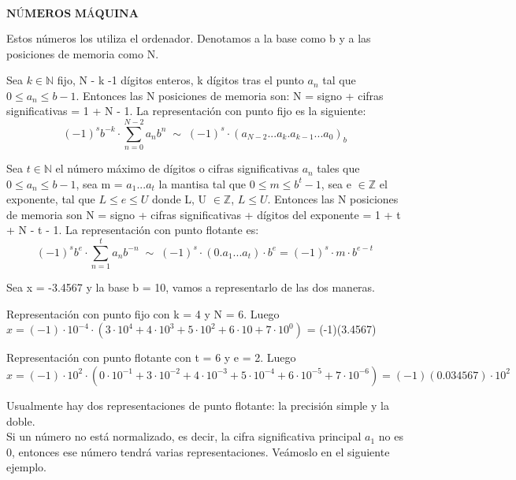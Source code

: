 $\textbf{NÚMEROS MÁQUINA}$

Estos números los utiliza el ordenador. Denotamos a la base como b y a las posiciones de memoria como N.

\begin{ndef}
Sea $k \in \mathbb{N}$ fijo, N - k -1 dígitos enteros, k dígitos tras el punto $a_n$ tal que $0 \leq a_n \leq b - 1$. Entonces las N posiciones de memoria son: N = signo + cifras significativas = 1 + N - 1. La representación con punto fijo es la siguiente:
\[ (-1)^s b^{-k} \cdot \sum_{n=0}^{N-2}a_nb^n \; \sim \; (-1)^s \cdot (a_{N-2}...a_k.a_{k-1}...a_0)_b \]
\end{ndef}

\begin{ndef}
Sea $t \in \mathbb{N}$ el número máximo de dígitos o cifras significativas $a_n$ tales que $0 \leq a_n \leq b - 1$, sea m = $a_1...a_t$ la mantisa tal que $0 \leq m \leq b^t - 1$, sea e $\in \mathbb{Z}$ el exponente, tal que $L \leq e \leq U$ donde L, U $\in \mathbb{Z}$, $L \leq U$. Entonces las N posiciones de memoria son N = signo + cifras significativas + dígitos del exponente = 1 + t + N - t - 1. La representación con punto flotante es:
\[ (-1)^sb^e \cdot \sum_{n=1}^t a_nb^{-n} \; \sim \; (-1)^s \cdot (0.a_1...a_t) \cdot b^e = (-1)^s \cdot m \cdot b^{e-t} \]
\end{ndef}

\begin{ejemplo}
Sea x = -3.4567 y la base b = 10, vamos a representarlo de las dos maneras.
	\begin{nlist}
	\item Representación con punto fijo con k = 4 y N = 6. Luego $x = (-1) \cdot 10^{-4} \cdot (3 \cdot 10^4 + 4 \cdot 10^3 + 5 \cdot 10^2 + 6 \cdot 10 + 7 \cdot 10^0)$ = (-1)(3.4567)
	\item Representación con punto flotante con t = 6 y e = 2. Luego $x = (-1) \cdot 10^2 \cdot (0 \cdot 10^{-1} + 3 \cdot 10^{-2} + 4 \cdot 10^{-3} + 5 \cdot 10^{-4} + 6 \cdot 10^{-5} + 7 \cdot 10^{-6}) = (-1)(0.034567) \cdot 10^2$
	\end{nlist}
\end{ejemplo}

Usualmente hay dos representaciones de punto flotante: la precisión simple y la doble.\\
Si un número no está normalizado, es decir, la cifra significativa principal $a_1$ no es 0, entonces ese número tendrá varias representaciones. Veámoslo en el siguiente ejemplo.

